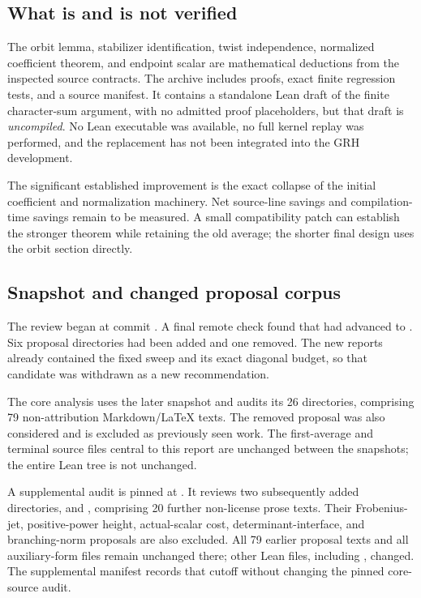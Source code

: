 \subsection{What is and is not verified}

The orbit lemma, stabilizer identification, twist independence, normalized coefficient theorem, and endpoint scalar are mathematical deductions from the inspected source contracts. The archive includes proofs, exact finite regression tests, and a source manifest. It contains a standalone Lean draft of the finite character-sum argument, with no admitted proof placeholders, but that draft is \emph{uncompiled}. No Lean executable was available, no full kernel replay was performed, and the replacement has not been integrated into the GRH development.

The significant established improvement is the exact collapse of the initial coefficient and normalization machinery. Net source-line savings and compilation-time savings remain to be measured. A small compatibility patch can establish the stronger theorem while retaining the old average; the shorter final design uses the orbit section directly.

\subsection{Snapshot and changed proposal corpus}

The review began at commit . A final remote check found that  had advanced to . Six proposal directories had been added and one removed. The new reports already contained the fixed sweep and its exact diagonal budget, so that candidate was withdrawn as a new recommendation.

The core analysis uses the later snapshot and audits its 26 directories, comprising 79 non-attribution Markdown/LaTeX texts. The removed  proposal was also considered and is excluded as previously seen work. The first-average and terminal source files central to this report are unchanged between the snapshots; the entire Lean tree is not unchanged.

A supplemental audit is pinned at . It reviews two subsequently added directories,  and , comprising 20 further non-license prose texts. Their Frobenius-jet, positive-power height, actual-scalar cost, determinant-interface, and branching-norm proposals are also excluded. All 79 earlier proposal texts and all auxiliary-form files remain unchanged there; other Lean files, including , changed. The supplemental manifest records that cutoff without changing the pinned core-source audit.

